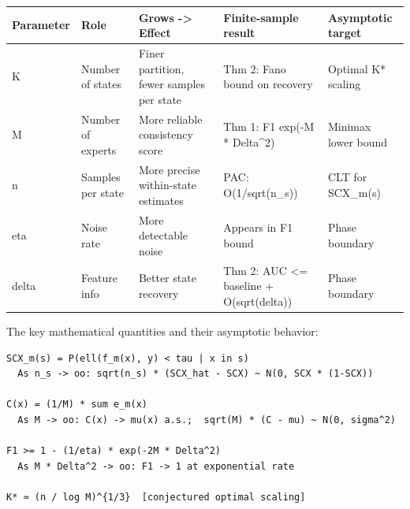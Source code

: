 \documentclass[
  12pt,
]{ctexart}
\begin{document}
\begin{longtable}[]{@{}
  >{\raggedright\arraybackslash}p{}
  >{\raggedright\arraybackslash}p{}
  >{\raggedright\arraybackslash}p{}
  >{\raggedright\arraybackslash}p{}
  >{\raggedright\arraybackslash}p{}@{}}
\toprule\noalign{}
\begin{minipage}[b]{\linewidth}\raggedright
Parameter
\end{minipage} & \begin{minipage}[b]{\linewidth}\raggedright
Role
\end{minipage} & \begin{minipage}[b]{\linewidth}\raggedright
Grows -\textgreater{} Effect
\end{minipage} & \begin{minipage}[b]{\linewidth}\raggedright
Finite-sample result
\end{minipage} & \begin{minipage}[b]{\linewidth}\raggedright
Asymptotic target
\end{minipage} \\
\midrule\noalign{}
\endhead
\bottomrule\noalign{}
\endlastfoot
K & Number of states & Finer partition, fewer samples per state & Thm 2:
Fano bound on recovery & Optimal K* scaling \\
M & Number of experts & More reliable consistency score & Thm 1: F1
exp(-M * Delta\^{}2) & Minimax lower bound \\
n & Samples per state & More precise within-state estimates & PAC:
O(1/sqrt(n\_s)) & CLT for SCX\_m(s) \\
eta & Noise rate & More detectable noise & Appears in F1 bound & Phase
boundary \\
delta & Feature info & Better state recovery & Thm 2: AUC \textless=
baseline + O(sqrt(delta)) & Phase boundary \\
\end{longtable}

The key mathematical quantities and their asymptotic behavior:

\begin{verbatim}
SCX_m(s) = P(ell(f_m(x), y) < tau | x in s)
  As n_s -> oo: sqrt(n_s) * (SCX_hat - SCX) ~ N(0, SCX * (1-SCX))

C(x) = (1/M) * sum e_m(x)
  As M -> oo: C(x) -> mu(x) a.s.;  sqrt(M) * (C - mu) ~ N(0, sigma^2)

F1 >= 1 - (1/eta) * exp(-2M * Delta^2)
  As M * Delta^2 -> oo: F1 -> 1 at exponential rate

K* ≈ (n / log M)^{1/3}  [conjectured optimal scaling]
\end{verbatim}
\end{document}
